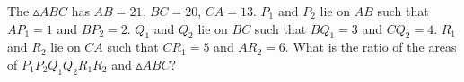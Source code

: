 The $\vartriangle ABC$ has $AB = 21$, $BC = 20$, $CA = 13$. $P_1$ and $P_2$ lie on $AB$ such that $AP_1 = 1$ and $BP_2 = 2$. $Q_1$ and $Q_2$ lie on $BC$ such that $BQ_1 = 3$ and $CQ_2 = 4$. $R_1$ and $R_2$ lie on $CA$ such that $CR_1 = 5$ and $AR_2 = 6$. What is the ratio of the areas of $P_1P_2Q_1Q_2R_1R_2$ and $\vartriangle ABC$?
